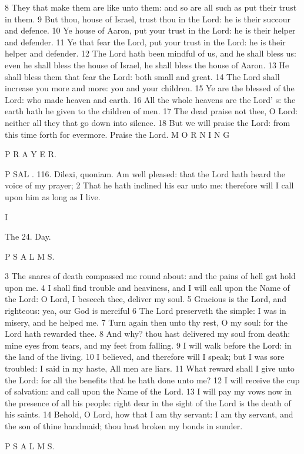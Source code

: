 8 They that make them are like unto them: and so are all such as put their trust in them. 9 But thou, house of Israel, trust thou in the Lord: he is their succour and defence. 10 Ye house of Aaron, put your trust in the Lord: he is their helper and defender. 11 Ye that fear the Lord, put your trust in the Lord: he is their helper and defender. 12 The Lord hath been mindful of us, and he shall bless us: even he shall bless the house of Israel, he shall bless the house of Aaron. 13 He shall bless them that fear the Lord: both small and great. 14 The Lord shall increase you more and more: you and your children. 15 Ye are the blessed of the Lord: who made heaven and earth. 16 All the whole heavens are the Lord’ s: the earth hath he given to the children of men. 17 The dead praise not thee, O Lord: neither all they that go down into silence. 18 But we will praise the Lord: from this time forth for evermore. Praise the Lord. M O R N I N G

P R A Y E R.

P SAL . 116. Dilexi, quoniam. Am well pleased: that the Lord hath heard the voice of my prayer; 2 That he hath inclined his ear unto me: therefore will I call upon him as long as I live.

I

The 24. Day.

P S A L M S.

3 The snares of death compassed me round about: and the pains of hell gat hold upon me. 4 I shall find trouble and heaviness, and I will call upon the Name of the Lord: O Lord, I beseech thee, deliver my soul. 5 Gracious is the Lord, and righteous: yea, our God is merciful 6 The Lord preserveth the simple: I was in misery, and he helped me. 7 Turn again then unto thy rest, O my soul: for the Lord hath rewarded thee. 8 And why? thou hast delivered my soul from death: mine eyes from tears, and my feet from falling. 9 I will walk before the Lord: in the land of the living. 10 I believed, and therefore will I speak; but I was sore troubled: I said in my haste, All men are liars. 11 What reward shall I give unto the Lord: for all the benefits that he hath done unto me? 12 I will receive the cup of salvation: and call upon the Name of the Lord. 13 I will pay my vows now in the presence of all his people: right dear in the sight of the Lord is the death of his saints. 14 Behold, O Lord, how that I am thy servant: I am thy servant, and the son of thine handmaid; thou hast broken my bonds in sunder.

P S A L M S.

